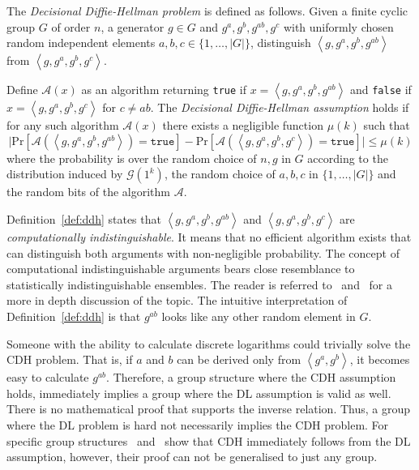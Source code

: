 \begin{defn}[DDH]
\label{def:ddh}
The \textit{Decisional Diffie-Hellman problem} is defined as follows. Given a finite cyclic group $G$ of order $n$, a generator $g \in G$ and $g^a, g^b, g^{ab}, g^c$ with uniformly chosen random independent elements $a, b, c \in \{ 1, \ldots, | G |\}$, distinguish $\left< g, g^a, g^b, g^{ab} \right>$ from $\left< g, g^a, g^b, g^c \right>$.

Define $\mathcal{A} \left( x \right)$ as an algorithm returning \texttt{true} if $x = \left< g, g^a, g^b, g^{ab} \right>$ and \texttt{false} if $x = \left< g, g^a, g^b, g^c \right>$ for $c \neq ab$. The \textit{Decisional Diffie-Hellman assumption} holds if for any such algorithm $\mathcal{A} \left( x \right)$ there exists a negligible function $\mu \left( k \right)$ such that 
 \begin{equation*}
  \lvert \textrm{Pr} \left[ \mathcal{A} \left( \left< g, g^a, g^b, g^{ab} \right> \right) = \texttt{true} \right] - \textrm{Pr} \left[ \mathcal{A} \left( \left< g, g^a, g^b, g^{c} \right> \right) = \texttt{true} \right] \rvert \leq \mu \left( k \right)
 \end{equation*}
 where the probability is over the random choice of $n, g$ in $G$ according to the distribution induced by $\mathcal{G} \left( 1^k \right)$, the random choice of $a, b, c$ in $\{ 1, \ldots, | G | \} $ and the random bits of the algorithm $\mathcal{A}$.
\end{defn}


Definition~\ref{def:ddh} states that $\left< g, g^a, g^b, g^{ab} \right>$ and $\left< g, g^a, g^b, g^{c} \right>$ are \textit{computationally indistinguishable}. It means that no efficient algorithm exists that can distinguish both arguments with non-negligible probability. The concept of computational indistinguishable arguments bears close resemblance to statistically indistinguishable ensembles. The reader is referred to~\cite{art:Goldwasser84} and~\cite{art:Goldwasser89} for a more in depth discussion of the topic. The intuitive interpretation of Definition~\ref{def:ddh} is that $g^{ab}$ looks like any other random element in $G$.

Someone with the ability to calculate discrete logarithms could trivially solve the CDH problem. That is, if $a$ and $b$ can be derived only from $\left< g^a, g^b \right>$, it becomes easy to calculate $g^{ab}$. Therefore, a group structure where the CDH assumption holds, immediately implies a group where the DL assumption is valid as well. There is no mathematical proof that supports the inverse relation. Thus, a group where the DL problem is hard not necessarily implies the CDH problem. For specific group structures~\cite{art:MaurerW98} and~\cite{art:MaurerW99} show that CDH immediately follows from the DL assumption, however, their proof can not be generalised to just any group.

